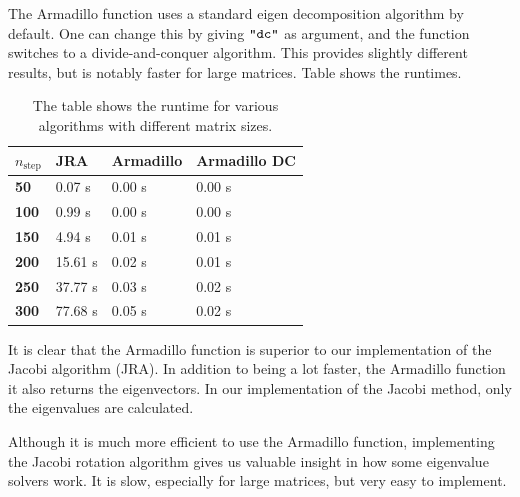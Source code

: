 The Armadillo function uses a standard eigen decomposition algorithm by default. One
can change this by giving $\verb|"dc"|$ as argument, and the function switches to a
divide-and-conquer algorithm. This provides slightly different results, but is notably
faster for large matrices. Table  shows the runtimes.
%
\begin{table}[htpb]
	\centering
	\begin{tabular}{|p{1cm}|p{1.5cm}|p{2cm}|p{2.5cm}|}
		\hline
		$n_{\mathrm{step}}$ & \textbf{JRA} & \textbf{Armadillo} & \textbf{Armadillo DC} \\
		\hline
		\hline
		\textbf{50} &  0.07 s & 0.00 s & 0.00 s \\
		\textbf{100} &  0.99 s & 0.00 s & 0.00 s \\
		\textbf{150} &  4.94 s & 0.01 s & 0.01 s \\
		\textbf{200} & 15.61 s & 0.02 s & 0.01 s \\
		\textbf{250} & 37.77 s & 0.03 s & 0.02 s \\
		\textbf{300} & 77.68 s & 0.05 s & 0.02 s \\
		\hline
	\end{tabular}
	\caption{The table shows the runtime for various algorithms with different matrix
	sizes.}
	\label{tab:runtime}
\end{table}
%
It is clear that the Armadillo function is superior to our implementation of the Jacobi
algorithm (JRA). In addition to being a lot faster, the Armadillo function it also returns
the eigenvectors. In our implementation of the Jacobi method, only the eigenvalues are
calculated.

Although it is much more efficient to use the Armadillo function, implementing the Jacobi
rotation algorithm gives us valuable insight in how some eigenvalue solvers work. It is
slow, especially for large matrices, but very easy to implement.

